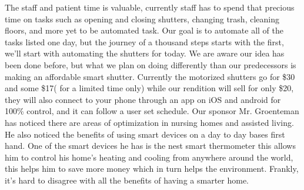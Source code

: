 The staff and patient time is valuable, currently staff has to spend that precious time on tasks such as opening and closing shutters, changing trash, cleaning floors, and more yet to be automated task. Our goal is to automate all of the tasks listed one day, but the journey of a thousand steps starts with the first, we’ll start with automating the shutters for today. We are aware our idea has been done before, but what we plan on doing differently than our predecessors is making an affordable smart shutter. Currently the motorized shutters go for \$30 and some \$17( for a limited time only) while our rendition will sell for only \$20, they will also connect to your phone through an app on iOS and android for 100\% control, and it can follow a user set schedule. Our sponsor Mr. Groenteman has noticed there are areas of optimization in nursing homes and assisted living. He also noticed the benefits of using smart devices on a day to day bases first hand. One of the smart devices he has is the nest smart thermometer this allows him to control his home’s heating and cooling from anywhere around the world, this helps him to save more money which in turn helps the environment. Frankly, it's hard to disagree with all the benefits of having a smarter home.